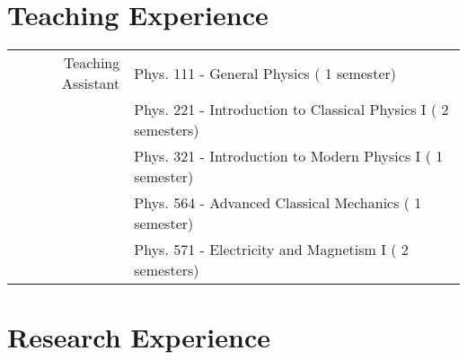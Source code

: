 \documentclass[a4paper,10pt]{article}
\begin{document}
\vspace{3mm}
\section{Teaching Experience}

\begin{tabular}{r | p{14.05cm}}
\multicolumn{1}{r|}{Teaching Assistant}		& Phys. 111 - General Physics \hfill ( 1 semester\phantom{s})				\\
\multicolumn{1}{r|}{}						& Phys. 221 - Introduction to Classical Physics I  \hfill ( 2 semesters) 		\\ 
\multicolumn{1}{r|}{}						& Phys. 321 - Introduction to Modern Physics I \hfill ( 1 semester\phantom{s}) 	\\
\multicolumn{1}{r|}{}						& Phys. 564 - Advanced Classical Mechanics \hfill ( 1 semester\phantom{s})	\\
\multicolumn{1}{r|}{}						& Phys. 571 - Electricity and Magnetism I \hfill ( 2 semesters) 				\\
\end{tabular}

\vspace{3mm}
\section{Research Experience}
\end{document}
